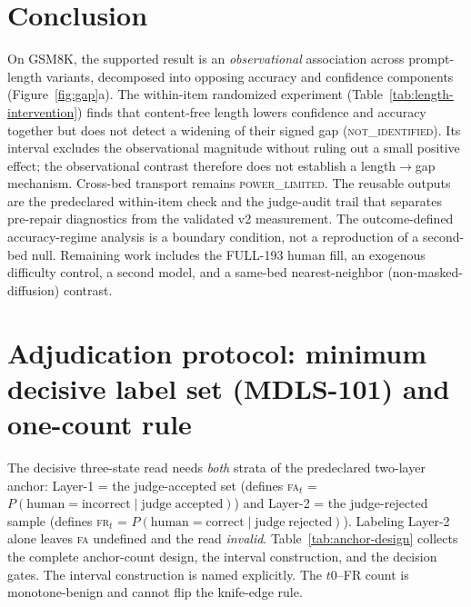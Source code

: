 \documentclass{article}
\begin{document}
\section{Conclusion}
On GSM8K, the supported result is an \emph{observational} association across
prompt-length variants, decomposed into opposing accuracy and confidence components
(Figure~\ref{fig:gap}a).  The within-item randomized experiment
(Table~\ref{tab:length-intervention}) finds that content-free length lowers confidence
and accuracy together but does not detect a widening of their signed gap
(\textsc{not\_identified}).  Its interval excludes the observational magnitude without
ruling out a small positive effect; the observational contrast therefore does not
establish a length$\to$gap mechanism.  Cross-bed transport remains
\textsc{power\_limited}.  The reusable outputs are the predeclared within-item check and
the judge-audit trail that separates pre-repair diagnostics from the validated v2
measurement.  The outcome-defined accuracy-regime analysis is a boundary condition, not
a reproduction of a second-bed null.  Remaining work includes the FULL-193 human fill,
an exogenous difficulty control, a second model, and a same-bed nearest-neighbor
(non-masked-diffusion) contrast.

\label{p5:main-text-end}

\begingroup
\fontsize{8.5}{9.4}\selectfont
\setlength{\bibsep}{0pt}


\endgroup

\appendix

\section{Adjudication protocol: minimum decisive label set (MDLS-101) and one-count rule}
\label{sec:mdls}

The decisive three-state read needs \emph{both} strata of the predeclared two-layer
anchor: Layer-1 = the judge-accepted set (defines \textsc{fa}$_t$ =
$P(\mathrm{human=incorrect}\mid\mathrm{judge\;accepted})$) and Layer-2 = the
judge-rejected sample (defines \textsc{fr}$_t$ =
$P(\mathrm{human=correct}\mid\mathrm{judge\;rejected})$).
Labeling Layer-2 alone leaves \textsc{fa} undefined and the read \emph{invalid}.
Table~\ref{tab:anchor-design} collects the complete anchor-count design, the interval
construction, and the decision gates.  The interval construction is named explicitly.
The $t0$--FR count is monotone-benign and cannot flip the
knife-edge rule.
\end{document}
